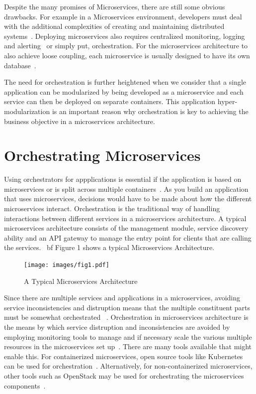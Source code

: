 Despite the many promises of Microservices, there are still some
obvious drawbacks. For example in a Microservices environment,
developers must deal with the additional complexities of creating and
maintaining distributed
systems~\cite{hid-sp18-501-patterns}. Deploying microservices also
requires centralized monitoring, logging and
alerting~\cite{hid-sp18-501-challenges} or simply put,
orchestration. For the microservices architecture to also achieve
loose coupling, each microservice is usually designed to have its own
database~\cite{hid-sp18-501-patterns}.

The need for orchestration is further heightened when we consider that
a single application can be modularized by being developed as a
microservice and each service can then be deployed on separate
containers. This application hyper-modularization is an important
reason why orchestration is key to achieving the business objective in
a microservices architecture.


\section{Orchestrating Microservices}
Using orchestrators for appplications is essential if the application
is based on microservices or is split across multiple
containers~\cite{hid-sp18-501-dotnet}. As you build an application
that uses microservices, decisions would have to be made about how the
different microservices interact. Orchestration is the traditional way
of handling interactions between different services in a microservices
architecture. A typical microservices architecture consists of the
management module, service discovery ability and an API gateway to
manage the entry point for clients that are calling the services. {\
bf Figure 1}
shows a typical Microservices Architecture.

\begin{figure}[!ht]
  \centering\texttt{[image: images/fig1.pdf]}
  \caption{A Typical Microservices Architecture~\cite{hid-sp18-501-fig1}}
\label{f:architecture}
\end{figure}

Since there are multiple services and applications in a microservices, 
avoiding
service inconsistencies and distruption means that the
multiple constituent parts must be somewhat orchestrated
~\cite{hid-sp18-501-opensource}. Orchestration in microservices 
architecture is the means by which service distruption and 
inconsistencies are avoided by employing monitoring tools to
manage and if necessary scale the various multiple resources 
in the microservices set up~\cite{hid-sp18-501-opensource}. 
There are many tools available 
that might enable this. For
containerized microservices, open source tools like Kubernetes
can be
used for orchestration~\cite{hid-sp18-501-onfido}. Alternatively, for
non-containerized microservices, other tools such as OpenStack may be
used for orchestrating the microservices
components~\cite{hid-sp18-501-rackspace}.

